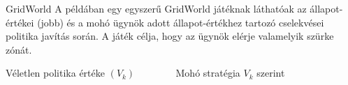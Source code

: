 \documentclass[english, aspectratio=169]{beamer}
\begin{document}
\begin{frame}{GridWorld}
A példában egy egyszerű GridWorld játéknak láthatóak az állapot-értékei (jobb) és a mohó ügynök adott állapot-értékhez tartozó cselekvései politika javítás során. A játék célja, hogy az ügynök elérje valamelyik szürke zónát.
\begin{center}
Véletlen politika értéke $(V_{k})\;\;\;\;\;\;\;\;\;\;\;\;\;\;\;$Mohó stratégia $V_{k}$ szerint

\end{center}
\end{frame}
\end{document}
